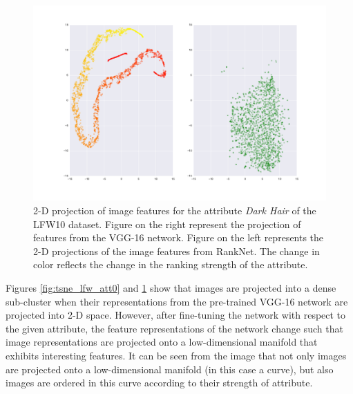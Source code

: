 \documentclass[10pt,twocolumn,letterpaper]{article}
\begin{document}
\begin{figure}
    \centering
    \includegraphics[width=18cm]{att1.pdf}
    \caption{2-D projection of image features for the attribute \textit{Dark Hair} of the LFW10 dataset. Figure on the right represent the projection of features from the VGG-16 network. Figure on the left represents the 2-D projections of the image features from RankNet. The change in color reflects the change in the ranking strength of the attribute.}
    \label{fig:tsne_lfw_att1}
\end{figure}

Figures \ref{fig:tsne_lfw_att0} and \ref{fig:tsne_lfw_att1} show that images are projected into a dense sub-cluster when their representations from the pre-trained VGG-16 network are projected into 2-D space. However, after fine-tuning the network with respect to the given attribute, the feature representations of the network change such that image representations are projected onto a low-dimensional manifold that exhibits interesting features. It can be seen from the image that not only images are projected onto a low-dimensional manifold (in this case a curve), but also images are ordered in this curve according to their strength of attribute.

{\small


}
\end{document}

